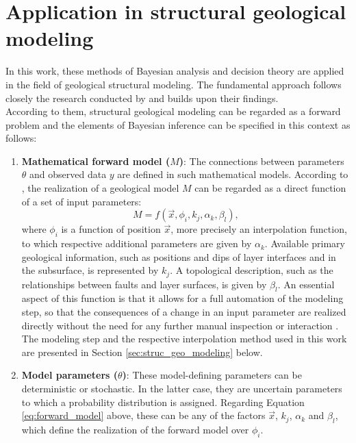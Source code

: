         \section{Application in structural geological modeling}\label{sec:bayes_in_struc_modeling}
        In this work, these methods of Bayesian analysis and decision theory are applied in the field of geological structural modeling. The fundamental approach follows closely the research conducted by \citet{delaVarga2016} and builds upon their findings.\\
        According to them, structural geological modeling can be regarded as a forward problem and the elements of Bayesian inference can be specified in this context as follows:
        \begin{enumerate}
        	\item \textbf{Mathematical forward model ($M$)}: The connections between parameters $\theta$ and observed data $y$ are defined in such mathematical models. According to \citet{delaVarga2016}, the realization of a geological model $M$ can be regarded as a direct function of a set of input parameters:
        	\begin{equation}
        	M = f(\vec{x}, \phi_i, k_j, \alpha_k, \beta_l)\label{eq:forward_model},
        	\end{equation}
        	where $\phi_i$ is a function of position $\vec{x}$, more precisely an interpolation function, to which respective additional parameters are given by $\alpha_k$. Available primary geological information, such as positions and dips of layer interfaces and in the subsurface, is represented by $k_j$. A topological description, such as the relationships between faults and layer surfaces, is given by $\beta_l$. An essential aspect of this function is that it allows for a full automation of the modeling step, so that the consequences of a change in an input parameter are realized directly without the need for any further manual inspection or interaction \citep{wellmann2017sandstone, delaVarga2016}. The modeling step and the respective interpolation method used in this work are presented in Section \ref{sec:struc_geo_modeling} below.
        	\item \textbf{Model parameters ($\theta$)}: These model-defining parameters can be deterministic or stochastic. In the latter case, they are uncertain parameters to which a probability distribution is assigned. Regarding Equation \ref{eq:forward_model} above, these can be any of the factors $\vec{x}$, $k_j$, $\alpha_k$ and $\beta_l$, which define the realization of the forward model over $\phi_i$.

\end{enumerate}
